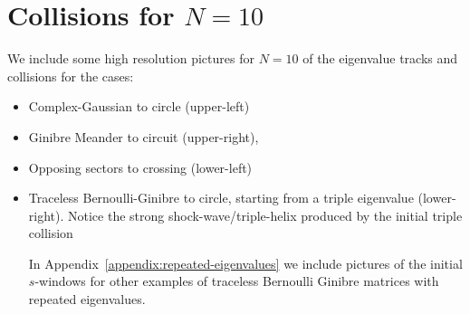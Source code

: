 \documentclass{article}
\begin{document}
	\section{Collisions for $N=10$} \label{appendix:several-curves}

	We include some high resolution pictures for $N=10$ of the eigenvalue tracks and collisions for the 
	cases: 
	
	\begin{itemize}
		\item Complex-Gaussian to circle (upper-left)

		\item Ginibre Meander to circuit (upper-right),

		\item Opposing sectors to crossing (lower-left)

		\item 	Traceless Bernoulli-Ginibre to circle, starting from a triple eigenvalue (lower-right). 
		Notice the strong shock-wave/triple-helix produced by the initial triple collision
	
		In Appendix~\ref{appendix:repeated-eigenvalues} we include pictures of the initial $s$-windows for other examples 
		of traceless Bernoulli Ginibre matrices with repeated eigenvalues.

	\end{itemize}
	 
	\newpage
\end{document}
